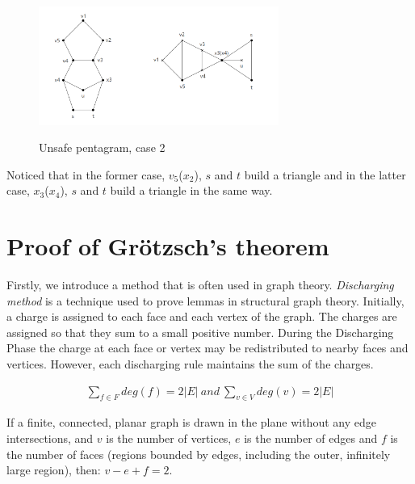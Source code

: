 \begin{figure}[H] %
\centering %
\includegraphics[width=0.7\textwidth]{figure/unsafepentagram2.png} 
\label{figure} %
\caption{Unsafe pentagram, case 2}
\end{figure}
Noticed that in the former case, $v_5$($x_2$), $s$ and $t$ build a triangle and in the latter case, $x_3$($x_4$), $s$ and $t$ build a triangle in the same way.

\section{Proof of Grötzsch's theorem}
Firstly, we introduce a method that is often used in graph theory. 
\textit{Discharging method} is a technique used to prove lemmas in structural graph theory. Initially, a charge is assigned to each face and each vertex of the graph. The charges are assigned so that they sum to a small positive number. During the Discharging Phase the charge at each face or vertex may be redistributed to nearby faces and vertices. However, each discharging rule maintains the sum of the charges. \cite{discharging}

\begin{observation}
\begin{align*}
    \sum_{f \in F}deg(f) = 2|E| \ and \ \sum_{v \in V}deg(v) = 2|E|
\end{align*}
\end{observation}

\begin{theorem}
If a finite, connected, planar graph is drawn in the plane without any edge intersections, and $v$ is the number of vertices, $e$ is the number of edges and $f$ is the number of faces (regions bounded by edges, including the outer, infinitely large region), then: $v-e+f=2$. \cite{euler}
\end{theorem}


